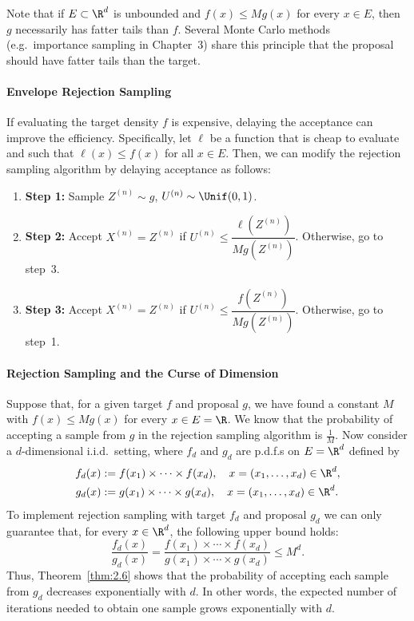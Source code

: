 \begin{remark}
\label{rem:2.7}
Note that if $E \subset \R^d$ is unbounded and $f(x) \le Mg(x)$ for every $x \in E$, then $g$
necessarily has fatter tails than $f$. Several Monte Carlo methods (e.g.\ importance sampling in
Chapter~3) share this principle that the proposal should have fatter tails than the target.
\end{remark}

\paragraph{Envelope Rejection Sampling}
If evaluating the target density $f$ is expensive, delaying the
acceptance can improve the efficiency. Specifically, let $\ell$ be a function that is cheap to evaluate
and such that $\ell(x) \le f(x)$ for all $x \in E$. Then, we can modify the rejection sampling algorithm
by delaying acceptance as follows:

\medskip
\begin{enumerate}
  \item \textbf{Step 1:} Sample $Z^{(n)} \sim g$, $U^{(n)} \sim \Unif(0,1)$.
  \item \textbf{Step 2:} Accept $X^{(n)} = Z^{(n)}$ if $U^{(n)} \le \dfrac{\ell(Z^{(n)})}{Mg(Z^{(n)})}$. Otherwise, go to step~3.
  \item \textbf{Step 3:} Accept $X^{(n)} = Z^{(n)}$ if $U^{(n)} \le \dfrac{f(Z^{(n)})}{Mg(Z^{(n)})}$. Otherwise, go to step~1.
\end{enumerate}
\medskip

\paragraph{Rejection Sampling and the Curse of Dimension}
Suppose that, for a given target $f$ and
proposal $g$, we have found a constant $M$ with $f(x) \le Mg(x)$ for every $x \in E = \R$. We know
that the probability of accepting a sample from $g$ in the rejection sampling algorithm is $\frac{1}{M}$. Now
consider a $d$-dimensional i.i.d.\ setting, where $f_d$ and $g_d$ are p.d.f.s on $E = \R^d$ defined by
\begin{align*}
  f_d(x) &:= f(x_1) \times \cdots \times f(x_d), \quad x = (x_1, \ldots, x_d) \in \R^d, \\
  g_d(x) &:= g(x_1) \times \cdots \times g(x_d), \quad x = (x_1, \ldots, x_d) \in \R^d.
\end{align*}
To implement rejection sampling with target $f_d$ and proposal $g_d$ we can only guarantee that, for
every $x \in \R^d$, the following upper bound holds:
\[
  \frac{f_d(x)}{g_d(x)} = \frac{f(x_1) \times \cdots \times f(x_d)}{g(x_1) \times \cdots \times g(x_d)} \le M^d.
\]
Thus, Theorem~\ref{thm:2.6} shows that the probability of accepting each sample from $g_d$ decreases exponentially with $d$. In other words, the expected number of iterations needed to obtain one sample
grows exponentially with $d$.

